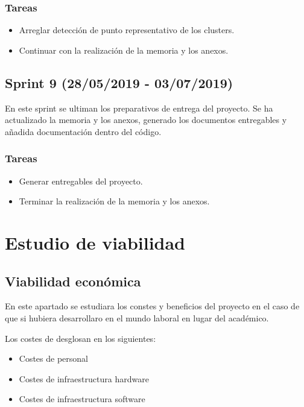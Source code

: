 \subsubsection{Tareas}
\begin{itemize}
\item Arreglar detección de punto representativo de los clusters.
\item Continuar con la realización de la memoria y los anexos.


\end{itemize}


\subsection{Sprint 9 (28/05/2019 - 03/07/2019)}
En este sprint se ultiman los preparativos de entrega del proyecto. Se ha actualizado la memoria y los anexos, generado los documentos entregables y añadida documentación dentro del código.



\subsubsection{Tareas}
\begin{itemize}
\item Generar entregables del proyecto.
\item Terminar la realización de la memoria y los anexos.


\end{itemize}



\section{Estudio de viabilidad}



\subsection{Viabilidad económica}

En este apartado se estudiara los constes y beneficios del proyecto en el caso de que si hubiera desarrollaro en el mundo laboral en lugar del académico.

Los costes de desglosan en los siguientes: \\
\begin{itemize}
\item Costes de personal
\item Costes de infraestructura hardware
\item Costes de infraestructura software
\end{itemize}


